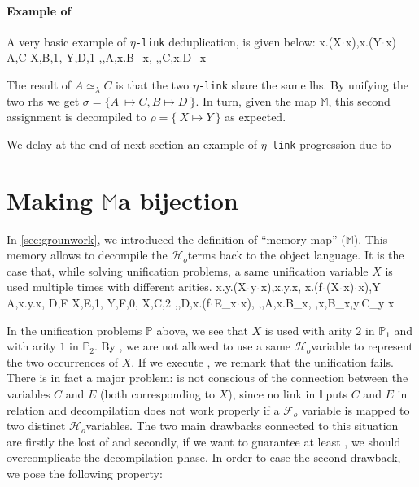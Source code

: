 \documentclass[sigconf,natbib=false,review]{acmart}
\newcommand{\appsep}{\ensuremath{\textcolor{lightgray}{\cdot}}}
\newcommand{\UnifRel}{\ensuremath{\simeq}}
\newcommand{\Ue}{\ensuremath{\UnifRel_\lambda}\xspace}
\newcommand{\linkMacro}[1]{\ensuremath{#1}\texttt{-link}\xspace}
\newcommand{\linketa} {\linkMacro{\eta}}
\newcommand{\Fo}{\texorpdfstring{\ensuremath{\mathcal{F}_{\!o}\xspace}}{Fo}} %
\newcommand{\Ho}{\texorpdfstring{\ensuremath{\mathcal{H}_o}\xspace}{Ho}}
\newcommand{\lhs}{lhs\xspace}
\newcommand{\rhs}{rhs\xspace}
\newcommand{\linkStore}{\texorpdfstring{\ensuremath{\mathbb{L}}\xspace}{L}}
\newcommand{\mapStore}{\texorpdfstring{\ensuremath{\mathbb{M}}\xspace}{M}}
\newcommand{\foUnifPb}{\ensuremath{\mathbb{P}}\xspace}
\begin{document}
\paragraph{Example of \progressetadedup}

A very basic example of \linketa deduplication, is given below:
\printAlll
  {{{\lambda x.(X\appsep x),\lambda x.(Y\appsep x)}}}
  {{{A,C}}}
  {{{X,B,1},
    {Y,D,1}}}
  {{{\eta,,A,\lambda x.B_{x}},
    {\eta,,C,\lambda x.D_{x}}}}

\noindent
The result of $A \Ue{} C$ is that the two \linketa share the same \lhs.
By unifying the two \rhs we get
$\sigma = \{ A~ \mapsto C, B \mapsto D ~\}$.
In turn, given the map \mapStore, this second assignment is decompiled to
$\rho = \{~ X \mapsto Y ~\}$ as expected.

We delay at the end of  next section an example of \linketa progression due to
\progressetaright


\section{Making \mapStore a bijection}
\label{sec:invariant1}

In \cref{sec:grounwork}, we introduced the definition of ``memory map'' (\mapStore).
This memory allows to decompile the \Ho terms back to the object language.
It is the case that, while solving unification problems, a same unification
variable $X$ is used multiple times with different arities.
%
\printAlll
  {{{\lambda x.\lambda y.(X\appsep y\appsep x),\lambda x.\lambda y.x},
    {\lambda x.(f\appsep (X\appsep x)\appsep x),Y}}}
  {{{A,\lambda x.\lambda y.x},
    {D,F}}}
  {{{X,E,1},
    {Y,F,0},
    {X,C,2}}}
  {{{\eta,,D,\lambda x.(f\appsep E_{x}\appsep x)},
    {\eta,,A,\lambda x.B_{x}},
    {\eta,x,B_{x},\lambda y.C_{y x}}}}

In the unification problems \foUnifPb above, we see that $X$ is used with arity $2$ in
$\foUnifPb_1$ and with arity $1$ in $\foUnifPb_2$. 
By , we are not allowed to use a same \Ho variable to 
represent the two occurrences of $X$.
If we execute \hrun, we remark that the unification fails.
There is in fact a major problem:
\hstep is not conscious of the connection between the variables $C$ and $E$ (both corresponding to $X$),
since no link in \linkStore puts $C$ and $E$ in relation and decompilation
does not work properly if a \Fo{} variable is mapped to two distinct \Ho variables. 
The two main drawbacks connected to this situation are 
firstly the lost of  and
secondly, if we want to guarantee at least , we should
overcomplicate the decompilation phase. In order to ease the second
drawback, we pose the following property:
\end{document}
